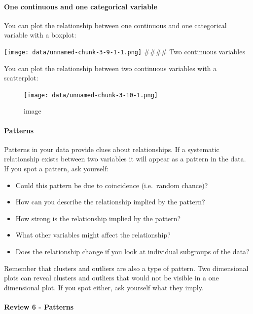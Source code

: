 \documentclass[
]{article}
\providecommand{\tightlist}{%
  \setlength{\itemsep}{0pt}\setlength{\parskip}{0pt}}
\begin{document}
\hypertarget{one-continuous-and-one-categorical-variable}{%
\paragraph{One continuous and one categorical
variable}\label{one-continuous-and-one-categorical-variable}}

You can plot the relationship between one continuous and one categorical
variable with a boxplot:

\texttt{[image: data/unnamed-chunk-3-9-1-1.png]} \#\#\#\# Two continuous
variables

You can plot the relationship between two continuous variables with a
scatterplot:

\begin{figure}
\centering
\texttt{[image: data/unnamed-chunk-3-10-1.png]}
\caption{image}
\end{figure}

\hypertarget{patterns}{%
\paragraph{Patterns}\label{patterns}}

Patterns in your data provide clues about relationships. If a systematic
relationship exists between two variables it will appear as a pattern in
the data. If you spot a pattern, ask yourself:

\begin{itemize}
\tightlist
\item
  Could this pattern be due to coincidence (i.e.~random chance)?
\item
  How can you describe the relationship implied by the pattern?
\item
  How strong is the relationship implied by the pattern?
\item
  What other variables might affect the relationship?
\item
  Does the relationship change if you look at individual subgroups of
  the data?
\end{itemize}

Remember that clusters and outliers are also a type of pattern. Two
dimensional plots can reveal clusters and outliers that would not be
visible in a one dimensional plot. If you spot either, ask yourself what
they imply.

\hypertarget{review-6---patterns}{%
\paragraph{Review 6 - Patterns}\label{review-6---patterns}}
\end{document}
